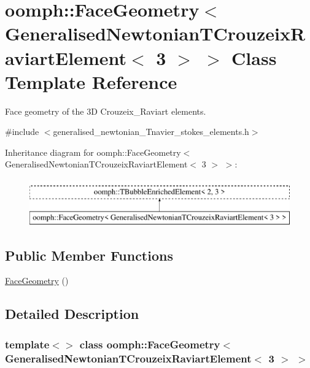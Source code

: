 \hypertarget{classoomph_1_1FaceGeometry_3_01GeneralisedNewtonianTCrouzeixRaviartElement_3_013_01_4_01_4}{}\section{oomph\+:\+:Face\+Geometry$<$ Generalised\+Newtonian\+T\+Crouzeix\+Raviart\+Element$<$ 3 $>$ $>$ Class Template Reference}
\label{classoomph_1_1FaceGeometry_3_01GeneralisedNewtonianTCrouzeixRaviartElement_3_013_01_4_01_4}


Face geometry of the 3D Crouzeix\+\_\+\+Raviart elements.  




{\ttfamily \#include $<$generalised\+\_\+newtonian\+\_\+\+Tnavier\+\_\+stokes\+\_\+elements.\+h$>$}

Inheritance diagram for oomph\+:\+:Face\+Geometry$<$ Generalised\+Newtonian\+T\+Crouzeix\+Raviart\+Element$<$ 3 $>$ $>$\+:\begin{figure}[H]
\begin{center}
\leavevmode
\includegraphics[height=2.000000cm]{classoomph_1_1FaceGeometry_3_01GeneralisedNewtonianTCrouzeixRaviartElement_3_013_01_4_01_4}
\end{center}
\end{figure}
\subsection*{Public Member Functions}
\begin{DoxyCompactItemize}
\item 
\hyperlink{classoomph_1_1FaceGeometry_3_01GeneralisedNewtonianTCrouzeixRaviartElement_3_013_01_4_01_4_a325f2234474496666611b08bd568cdf0}{Face\+Geometry} ()
\end{DoxyCompactItemize}


\subsection{Detailed Description}
\subsubsection*{template$<$$>$\newline
class oomph\+::\+Face\+Geometry$<$ Generalised\+Newtonian\+T\+Crouzeix\+Raviart\+Element$<$ 3 $>$ $>$}

